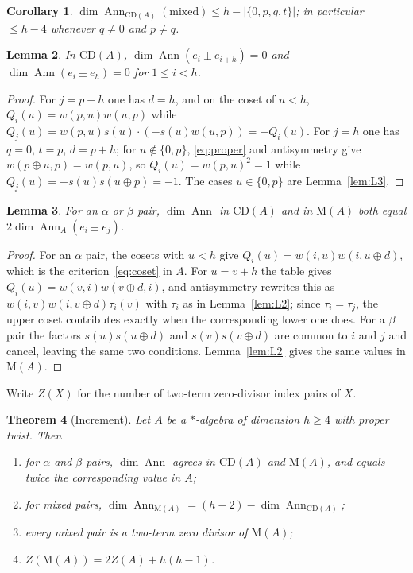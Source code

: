 \documentclass[11pt]{amsart}
\theoremstyle{plain}
\newtheorem{theorem}{Theorem}[section]
\newtheorem{lemma}[theorem]{Lemma}
\newtheorem{corollary}[theorem]{Corollary}
\theoremstyle{definition}
\newcommand{\CD}{\mathrm{CD}}
\newcommand{\MM}{\mathrm{M}}
\newcommand{\Ann}{\operatorname{Ann}}
\begin{document}
\begin{corollary}\label{cor:bound}
$\dim\Ann_{\CD(A)}(\text{mixed})\leq h-\lvert\{0,p,q,t\}\rvert$; in particular
$\leq h-4$ whenever $q\neq0$ and $p\neq q$.
\end{corollary}

\begin{lemma}\label{lem:L4}
In $\CD(A)$, $\dim\Ann(e_i\pm e_{i+h})=0$ and $\dim\Ann(e_i\pm e_h)=0$ for
$1\leq i<h$.
\end{lemma}

\begin{proof}
For $j=p+h$ one has $d=h$, and on the coset of $u<h$,
$Q_i(u)=w(p,u)w(u,p)$ while
$Q_j(u)=w(p,u)s(u)\cdot(-s(u)w(u,p))=-Q_i(u)$.
For $j=h$ one has $q=0$, $t=p$, $d=p+h$; for $u\notin\{0,p\}$, \eqref{eq:proper}
and antisymmetry give $w(p\oplus u,p)=w(p,u)$, so $Q_i(u)=w(p,u)^2=1$ while
$Q_j(u)=-s(u)s(u\oplus p)=-1$. The cases $u\in\{0,p\}$ are Lemma~\ref{lem:L3}.
\end{proof}

\begin{lemma}\label{lem:L5}
For an $\alpha$ or $\beta$ pair, $\dim\Ann$ in $\CD(A)$ and in $\MM(A)$ both
equal $2\dim\Ann_{A}(e_i\pm e_j)$.
\end{lemma}

\begin{proof}
For an $\alpha$ pair, the cosets with $u<h$ give $Q_i(u)=w(i,u)w(i,u\oplus d)$,
which is the criterion~\eqref{eq:coset} in $A$. For $u=v+h$ the table gives
$Q_i(u)=w(v,i)w(v\oplus d,i)$, and antisymmetry rewrites this as
$w(i,v)w(i,v\oplus d)\tau_i(v)$ with $\tau_i$ as in Lemma~\ref{lem:L2}; since
$\tau_i=\tau_j$, the upper coset contributes exactly when the corresponding
lower one does. For a $\beta$ pair the factors $s(u)s(u\oplus d)$ and
$s(v)s(v\oplus d)$ are common to $i$ and $j$ and cancel, leaving the same two
conditions. Lemma~\ref{lem:L2} gives the same values in $\MM(A)$.
\end{proof}

Write $Z(X)$ for the number of two-term zero-divisor index pairs of $X$.

\begin{theorem}[Increment]\label{thm:increment}
Let $A$ be a $*$-algebra of dimension $h\geq4$ with proper twist. Then
\begin{enumerate}
\item[(a)] for $\alpha$ and $\beta$ pairs, $\dim\Ann$ agrees in $\CD(A)$ and
  $\MM(A)$, and equals twice the corresponding value in $A$;
\item[(b)] for mixed pairs,
  $\displaystyle \dim\Ann_{\MM(A)}=(h-2)-\dim\Ann_{\CD(A)}$;
\item[(c)] every mixed pair is a two-term zero divisor of $\MM(A)$;
\item[(d)] $Z(\MM(A))=2Z(A)+h(h-1)$.
\end{enumerate}
\end{theorem}
\end{document}
